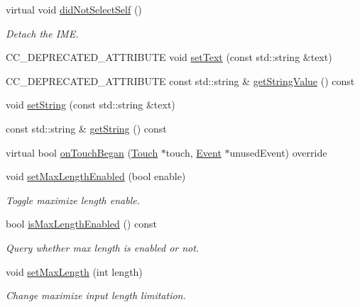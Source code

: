 \begin{DoxyCompactItemize}
\mbox{\label{classui_1_1TextField_ac3f56921a15305b45f097d688a899c3b}} 
virtual void \hyperlink{classui_1_1TextField_ac3f56921a15305b45f097d688a899c3b}{did\+Not\+Select\+Self} ()
\begin{DoxyCompactList}\small\item\em Detach the I\+ME. \end{DoxyCompactList}\item 
C\+C\+\_\+\+D\+E\+P\+R\+E\+C\+A\+T\+E\+D\+\_\+\+A\+T\+T\+R\+I\+B\+U\+TE void \hyperlink{classui_1_1TextField_adcd37c99947c549a77ffbd3389e176b3}{set\+Text} (const std\+::string \&text)
\item 
C\+C\+\_\+\+D\+E\+P\+R\+E\+C\+A\+T\+E\+D\+\_\+\+A\+T\+T\+R\+I\+B\+U\+TE const std\+::string \& \hyperlink{classui_1_1TextField_afc22b95a00cce564179260e456ad9ff3}{get\+String\+Value} () const
\item 
void \hyperlink{classui_1_1TextField_a7bd0a4832cf52651f5fccfb15d3c97c4}{set\+String} (const std\+::string \&text)
\item 
const std\+::string \& \hyperlink{classui_1_1TextField_a576e4aa7e79b9cb1bf8d7c4497c96c74}{get\+String} () const
\item 
virtual bool \hyperlink{classui_1_1TextField_ad747be5e9c98b2aa44d839dfd282fc2e}{on\+Touch\+Began} (\hyperlink{classTouch}{Touch} $\ast$touch, \hyperlink{classEvent}{Event} $\ast$unused\+Event) override
\item 
void \hyperlink{classui_1_1TextField_a519ce96bf6df5bf88f1952ddf0acfa7a}{set\+Max\+Length\+Enabled} (bool enable)
\begin{DoxyCompactList}\small\item\em Toggle maximize length enable. \end{DoxyCompactList}\item 
bool \hyperlink{classui_1_1TextField_af1c9a7bd43a96e69cda3a2ab4e93758b}{is\+Max\+Length\+Enabled} () const
\begin{DoxyCompactList}\small\item\em Query whether max length is enabled or not. \end{DoxyCompactList}\item 
void \hyperlink{classui_1_1TextField_ad952090257800bf298acb875d4462c0a}{set\+Max\+Length} (int length)
\begin{DoxyCompactList}\small\item\em Change maximize input length limitation. \end{DoxyCompactList}\item 

\end{DoxyCompactItemize}
